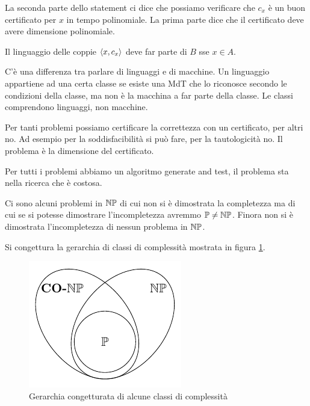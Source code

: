La seconda parte dello statement ci dice che possiamo verificare che $c_{x}$ è un buon certificato per
$x$ in tempo polinomiale. La prima parte dice che il certificato deve avere dimensione polinomiale.

Il linguaggio delle coppie $\langle x, c_{x} \rangle$ deve far parte di $B$ sse $x \in A$. 

C'è una differenza tra parlare di linguaggi e di macchine. Un linguaggio appartiene ad una certa
classe se esiste una MdT che lo riconosce secondo le condizioni della classe, ma non è la macchina
a far parte della classe. Le classi comprendono linguaggi, non macchine.

Per tanti problemi possiamo certificare la correttezza con un certificato, per altri no. Ad esempio
per la soddisfacibilità si può fare, per la tautologicità no. Il problema è la dimensione del
certificato.

Per tutti i problemi abbiamo un algoritmo generate and test, il problema sta nella ricerca che è
costosa.


Ci sono alcuni problemi in $\mathbb{NP}$ di cui non si è dimostrata la completezza ma di cui se si potesse
dimostrare l'incompletezza avremmo $\mathbb{P} \not= \mathbb{NP}$. Finora non si è dimostrata l'incompletezza di
nessun problema in $\mathbb{NP}$.


Si congettura la gerarchia di classi di complessità mostrata in figura \ref{ConjecturedHierarchy}.

\begin{figure}[h]
    \begin{center}
        \includegraphics{./img/complexity_intro/NPCONP.pdf}
    \end{center}
    \caption{Gerarchia congetturata di alcune classi di complessità}
    \label{ConjecturedHierarchy}
\end{figure}

